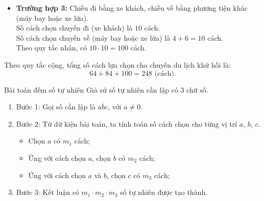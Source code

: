 \begin{vd}
{\begin{enumerate}
\begin{itemize}
				\item \textbf{Trường hợp 3:} Chiều đi bằng xe khách, chiều về bằng phương tiện khác (máy bay hoặc xe lửa). \\
				Số cách chọn chuyến đi (xe khách) là $10$ cách. \\
				Số cách chọn chuyến về (máy bay hoặc xe lửa) là $4 + 6 = 10$ cách. \\
				Theo quy tắc nhân, có $10 \cdot 10 = 100$ cách.
			\end{itemize}
			Theo quy tắc cộng, tổng số cách lựa chọn cho chuyến du lịch khứ hồi là:
			$$64 + 84 + 100 = 248 \text{ (cách).}$$
		\end{enumerate}
	}
\end{vd}

\begin{dang}{Bài toán đếm số tự nhiên}
	Giả sử số tự nhiên cần lập có 3 chữ số.
	\begin{enumerate}[1.]
		\item Bước 1: Gọi số cần lập là $\overline{abc}$, với $a \ne 0$.
		\item Bước 2: Từ dữ kiện bài toán, ta tính toán số cách chọn cho từng vị trí $a$, $b$, $c$. 
		\begin{itemize}
			\item Chọn $a$ có $m_1$ cách;
			\item Ứng với cách chọn $a$, chọn $b$ có $m_2$ cách;
			\item Ứng với cách chọn $a$ và $b$, chọn $c$ có $m_3$ cách;
		\end{itemize}
	\item Bước 3: Kết luận có $m_1 \cdot m_2 \cdot m_3$ số tự nhiên được tạo thành.
	\end{enumerate}
\end{dang}

